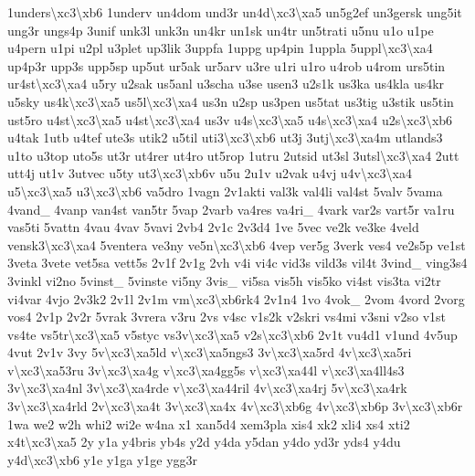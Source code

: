 \begin{DoxyCompactItemize}
1unders\textbackslash{}xc3\textbackslash{}xb6 1underv un4dom und3r un4d\textbackslash{}xc3\textbackslash{}xa5 un5g2ef un3gersk ung5it ung3r ungs4p 3unif unk3l unk3n un4kr un1sk un4tr un5trati u5nu u1o u1pe u4pern u1pi u2pl u3plet up3lik 3uppfa 1uppg up4pin 1uppla 5uppl\textbackslash{}xc3\textbackslash{}xa4 up4p3r upp3s upp5sp up5ut ur5ak ur5arv u3re u1ri u1ro u4rob u4rom urs5tin ur4st\textbackslash{}xc3\textbackslash{}xa4 u5ry u2sak us5anl u3scha u3se usen3 u2s1k us3ka us4kla us4kr u5sky us4k\textbackslash{}xc3\textbackslash{}xa5 us5l\textbackslash{}xc3\textbackslash{}xa4 us3n u2sp us3pen us5tat us3tig u3stik us5tin ust5ro u4st\textbackslash{}xc3\textbackslash{}xa5 u4st\textbackslash{}xc3\textbackslash{}xa4 us3v u4s\textbackslash{}xc3\textbackslash{}xa5 u4s\textbackslash{}xc3\textbackslash{}xa4 u2s\textbackslash{}xc3\textbackslash{}xb6 u4tak 1utb u4tef ute3s utik2 u5til uti3\textbackslash{}xc3\textbackslash{}xb6 ut3j 3utj\textbackslash{}xc3\textbackslash{}xa4m utlands3 u1to u3top uto5s ut3r ut4rer ut4ro ut5rop 1utru 2utsid ut3sl 3utsl\textbackslash{}xc3\textbackslash{}xa4 2utt utt4j ut1v 3utvec u5ty ut3\textbackslash{}xc3\textbackslash{}xb6v u5u 2u1v u2vak u4vj u4v\textbackslash{}xc3\textbackslash{}xa4 u5\textbackslash{}xc3\textbackslash{}xa5 u3\textbackslash{}xc3\textbackslash{}xb6 va5dro 1vagn 2v1akti val3k val4li val4st 5valv 5vama 4vand\-\_\- 4vanp van4st van5tr 5vap 2varb va4res va4ri\-\_\- 4vark var2s vart5r va1ru vas5ti 5vattn 4vau 4vav 5vavi 2vb4 2v1c 2v3d4 1ve 5vec ve2k ve3ke 4veld vensk3\textbackslash{}xc3\textbackslash{}xa4 5ventera ve3ny ve5n\textbackslash{}xc3\textbackslash{}xb6 4vep ver5g 3verk ves4 ve2s5p ve1st 3veta 3vete vet5sa vett5s 2v1f 2v1g 2vh v4i vi4c vid3s vild3s vil4t 3vind\-\_\- ving3s4 3vinkl vi2no 5vinst\-\_\- 5vinste vi5ny 3vis\-\_\- vi5sa vis5h vis5ko vi4st vis3ta vi2tr vi4var 4vjo 2v3k2 2v1l 2v1m vm\textbackslash{}xc3\textbackslash{}xb6rk4 2v1n4 1vo 4vok\-\_\- 2vom 4vord 2vorg vos4 2v1p 2v2r 5vrak 3vrera v3ru 2vs v4sc v1s2k v2skri vs4mi v3sni v2so v1st vs4te vs5tr\textbackslash{}xc3\textbackslash{}xa5 v5styc vs3v\textbackslash{}xc3\textbackslash{}xa5 v2s\textbackslash{}xc3\textbackslash{}xb6 2v1t vu4d1 v1und 4v5up 4vut 2v1v 3vy 5v\textbackslash{}xc3\textbackslash{}xa5ld v\textbackslash{}xc3\textbackslash{}xa5ngs3 3v\textbackslash{}xc3\textbackslash{}xa5rd 4v\textbackslash{}xc3\textbackslash{}xa5ri v\textbackslash{}xc3\textbackslash{}xa53ru 3v\textbackslash{}xc3\textbackslash{}xa4g v\textbackslash{}xc3\textbackslash{}xa4gg5s v\textbackslash{}xc3\textbackslash{}xa44l v\textbackslash{}xc3\textbackslash{}xa4ll4s3 3v\textbackslash{}xc3\textbackslash{}xa4nl 3v\textbackslash{}xc3\textbackslash{}xa4rde v\textbackslash{}xc3\textbackslash{}xa44ril 4v\textbackslash{}xc3\textbackslash{}xa4rj 5v\textbackslash{}xc3\textbackslash{}xa4rk 3v\textbackslash{}xc3\textbackslash{}xa4rld 2v\textbackslash{}xc3\textbackslash{}xa4t 3v\textbackslash{}xc3\textbackslash{}xa4x 4v\textbackslash{}xc3\textbackslash{}xb6g 4v\textbackslash{}xc3\textbackslash{}xb6p 3v\textbackslash{}xc3\textbackslash{}xb6r 1wa we2 w2h whi2 wi2e w4na x1 xan5d4 xem3pla xis4 xk2 xli4 xs4 xti2 x4t\textbackslash{}xc3\textbackslash{}xa5 2y y1a y4bris yb4s y2d y4da y5dan y4do yd3r yds4 y4du y4d\textbackslash{}xc3\textbackslash{}xb6 y1e y1ga y1ge ygg3r 
\end{DoxyCompactItemize}
